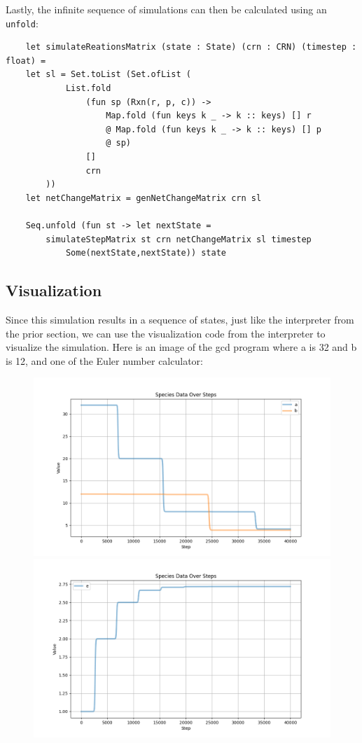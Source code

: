 Lastly, the infinite sequence of simulations can then be calculated using an \texttt{unfold}:
\begin{verbatim}
    let simulateReationsMatrix (state : State) (crn : CRN) (timestep : float) = 
    let sl = Set.toList (Set.ofList (
            List.fold
                (fun sp (Rxn(r, p, c)) ->
                    Map.fold (fun keys k _ -> k :: keys) [] r
                    @ Map.fold (fun keys k _ -> k :: keys) [] p
                    @ sp)
                []
                crn
        ))
    let netChangeMatrix = genNetChangeMatrix crn sl

    Seq.unfold (fun st -> let nextState = 
        simulateStepMatrix st crn netChangeMatrix sl timestep
            Some(nextState,nextState)) state

\end{verbatim}

\subsection{Visualization}
Since this simulation results in a sequence of states, just like the interpreter from the prior section, we can use the visualization code from the interpreter to visualize the simulation. Here is an image of the gcd program where a is 32 and b is 12, and one of the Euler number calculator:

\begin{figure}[H]
    \centering
    \includegraphics[scale=0.3]{report/figures/gcdplot.png}
    \includegraphics[scale=0.3]{report/figures/eulerplot.png}
\end{figure}
